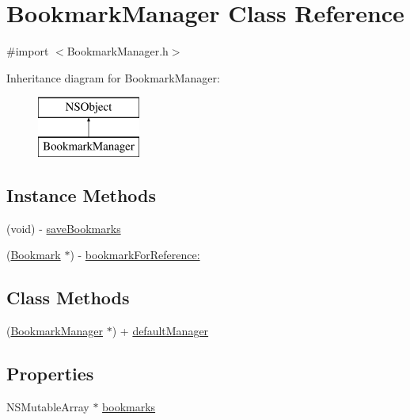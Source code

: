 \hypertarget{interface_bookmark_manager}{\section{Bookmark\-Manager Class Reference}
\label{interface_bookmark_manager}
}


{\ttfamily \#import $<$Bookmark\-Manager.\-h$>$}

Inheritance diagram for Bookmark\-Manager\-:\begin{figure}[H]
\begin{center}
\leavevmode
\includegraphics[height=2.000000cm]{interface_bookmark_manager}
\end{center}
\end{figure}
\subsection*{Instance Methods}
\begin{DoxyCompactItemize}
\item 
(void) -\/ \hyperlink{interface_bookmark_manager_ad5be338bde1930fbb85ace7421d35736}{save\-Bookmarks}
\item 
(\hyperlink{interface_bookmark}{Bookmark} $\ast$) -\/ \hyperlink{interface_bookmark_manager_a5bc9ddf12c99748e5f75a381434956e3}{bookmark\-For\-Reference\-:}
\end{DoxyCompactItemize}
\subsection*{Class Methods}
\begin{DoxyCompactItemize}
\item 
(\hyperlink{interface_bookmark_manager}{Bookmark\-Manager} $\ast$) + \hyperlink{interface_bookmark_manager_aa77bb1fd7dc37cab9370d01e5e9d076d}{default\-Manager}
\end{DoxyCompactItemize}
\subsection*{Properties}
\begin{DoxyCompactItemize}
\item 
N\-S\-Mutable\-Array $\ast$ \hyperlink{interface_bookmark_manager_aa476c46dac9eb059308b6cfc593bc9a4}{bookmarks}
\end{DoxyCompactItemize}


